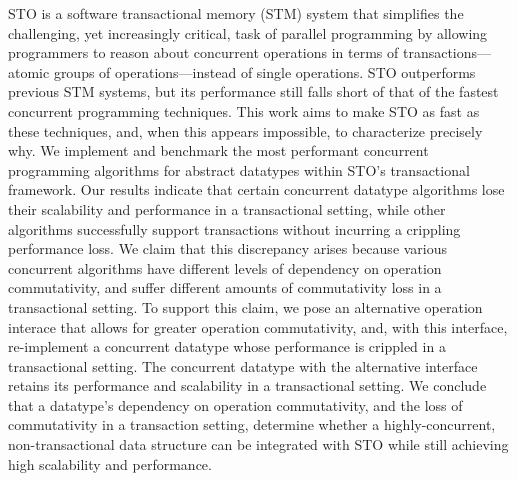 STO is a software transactional memory (STM) system that simplifies the challenging, yet increasingly critical, task of parallel programming by allowing programmers to reason about concurrent operations in terms of transactions---atomic groups of operations---instead of single operations.  
STO outperforms previous STM systems, but its performance still falls short of that of the fastest concurrent programming techniques. This work aims to make STO as fast as these techniques, and, when this appears impossible, to characterize precisely why. 
We implement and benchmark the most performant concurrent programming algorithms for abstract datatypes within STO's transactional framework. Our results indicate that certain concurrent datatype algorithms lose their scalability and performance in a transactional setting, while other algorithms successfully support transactions without incurring a crippling performance loss. We claim that this discrepancy arises because various concurrent algorithms have different levels of dependency on operation commutativity, and suffer different amounts of commutativity loss in a transactional setting. To support this claim, we pose an alternative operation interace that allows for greater operation commutativity, and, with this interface, re-implement a concurrent datatype whose performance is crippled in a transactional setting. The concurrent datatype with the alternative interface retains its performance and scalability in a transactional setting.
We conclude that a datatype's dependency on operation commutativity, and the loss of commutativity in a transaction setting, determine whether a highly-concurrent, non-transactional data structure can be integrated with STO while still achieving high scalability and performance.
